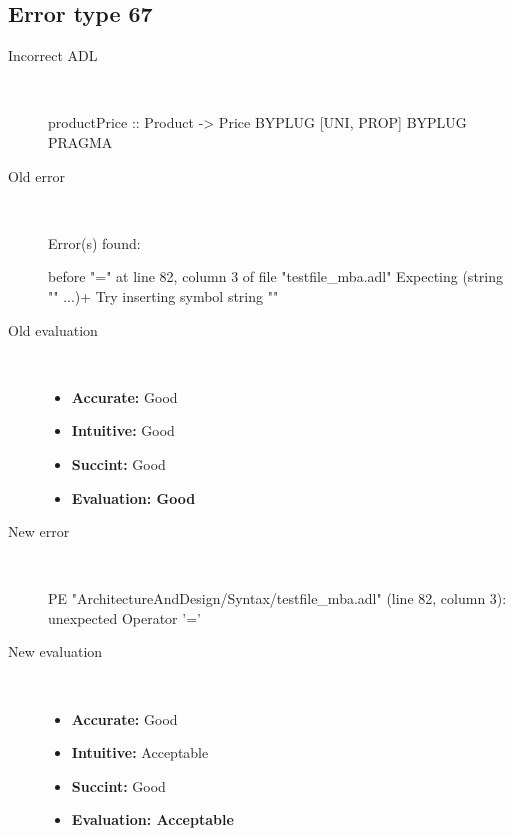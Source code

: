 \hrulefill

\subsection{Error type 67}
  \begin{description}
  \item[Incorrect ADL]~\\
\begin{adl}
productPrice :: Product -> Price BYPLUG [UNI, PROP] BYPLUG PRAGMA\end{adl}
  \item[Old error]~\\
\begin{haskell}
Error(s) found:

before "=" at line 82, column 3 of file "testfile_mba.adl"
Expecting (string "" ...)+
Try inserting symbol string ""\end{haskell}
  \item[Old evaluation]~\\
    \begin{itemize}
    \item \textbf{Accurate:} Good
    \item \textbf{Intuitive:} Good
    \item \textbf{Succint:} Good
    \item \textbf{Evaluation: Good}
    \end{itemize}
  \item[New error]~\\
\begin{haskell}
PE "ArchitectureAndDesign/Syntax/testfile_mba.adl" (line 82, column 3):
unexpected Operator '='\end{haskell}
  \item[New evaluation]~\\
    \begin{itemize}
    \item \textbf{Accurate:} Good
    \item \textbf{Intuitive:} Acceptable
    \item \textbf{Succint:} Good
    \item \textbf{Evaluation: Acceptable
}
    \end{itemize}
  \end{description}

\hrulefill

